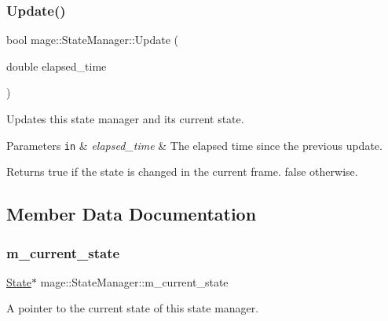 \subsubsection{\texorpdfstring{Update()}{Update()}}
{\footnotesize\ttfamily bool mage\+::\+State\+Manager\+::\+Update (\begin{DoxyParamCaption}\item[{double}]{elapsed\+\_\+time }\end{DoxyParamCaption})}

Updates this state manager and its current state.


\begin{DoxyParams}[1]{Parameters}
\mbox{\tt in}  & {\em elapsed\+\_\+time} & The elapsed time since the previous update. \\
\hline
\end{DoxyParams}
\begin{DoxyReturn}{Returns}
{\ttfamily true} if the state is changed in the current frame. {\ttfamily false} otherwise. 
\end{DoxyReturn}


\subsection{Member Data Documentation}
\hypertarget{classmage_1_1_state_manager_a737122d580b709e0d122db4a6e1d9006}{}\label{classmage_1_1_state_manager_a737122d580b709e0d122db4a6e1d9006} 
\subsubsection{\texorpdfstring{m\+\_\+current\+\_\+state}{m\_current\_state}}
{\footnotesize\ttfamily \hyperlink{classmage_1_1_state}{State}$\ast$ mage\+::\+State\+Manager\+::m\+\_\+current\+\_\+state\hspace{0.3cm}{\ttfamily [private]}}

A pointer to the current state of this state manager. \hypertarget{classmage_1_1_state_manager_a8e905ec2358a18a5b56d44cf79799afa}{}\label{classmage_1_1_state_manager_a8e905ec2358a18a5b56d44cf79799afa} 

